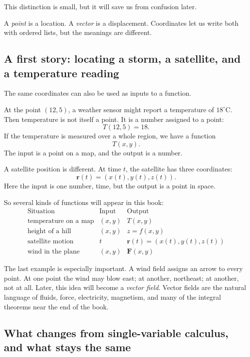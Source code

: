 This distinction is small, but it will save us from confusion later.

A \emph{point} is a location.  A \emph{vector} is a displacement.  Coordinates let us
write both with ordered lists, but the meanings are different.

\subsection{A first story: locating a storm, a satellite, and a temperature reading}

The same coordinates can also be used as inputs to a function.

At the point \((12,5)\), a weather sensor might report a temperature of
\(18^\circ\)C.  Then temperature is not itself a point.  It is a number assigned to a
point:
\[
    T(12,5)=18.
\]
If the temperature is measured over a whole region, we have a function
\[
    T(x,y).
\]
The input is a point on a map, and the output is a number.

A satellite position is different.  At time \(t\), the satellite has three coordinates:
\[
    \mathbf r(t)=(x(t),y(t),z(t)).
\]
Here the input is one number, time, but the output is a point in space.

So several kinds of functions will appear in this book:
\[
\begin{array}{c|c|c}
\text{Situation} & \text{Input} & \text{Output} \\ \hline
\text{temperature on a map} & (x,y) & T(x,y) \\
\text{height of a hill} & (x,y) & z=f(x,y) \\
\text{satellite motion} & t & \mathbf r(t)=(x(t),y(t),z(t)) \\
\text{wind in the plane} & (x,y) & \mathbf F(x,y)
\end{array}
\]

The last example is especially important.  A wind field assigns an arrow to every
point.  At one point the wind may blow east; at another, northeast; at another, not
at all.  Later, this idea will become a \emph{vector field}.  Vector fields are the
natural language of fluids, force, electricity, magnetism, and many of the integral
theorems near the end of the book.

\subsection{What changes from single-variable calculus, and what stays the same}


